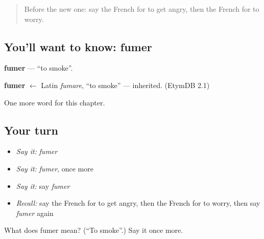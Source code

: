 \begin{quote}
Before the new one: say the French for to get angry, then the French for to worry.
\end{quote}

\subsection*{You'll want to know: fumer}
\textbf{fumer} — \textquotedblleft{}to smoke\textquotedblright{}.

\begin{cousinweb}
\textbf{fumer} $\leftarrow$ Latin \emph{fumare}, \textquotedblleft{}to smoke\textquotedblright{} — inherited. (EtymDB 2.1)
\end{cousinweb}

\begin{grammarlens}[title={What you've built}]
One more word for this chapter.
\end{grammarlens}

\subsection*{Your turn}
\begin{itemize}
\raggedright
  \item \emph{Say it:} \emph{fumer}
  \item \emph{Say it:} \emph{fumer}, once more
  \item \emph{Say it:} say \emph{fumer}
  \item \emph{Recall:} say the French for to get angry, then the French for to worry, then say \emph{fumer} again
\end{itemize}

\begin{tcolorbox}[breakable,colback=teal!4,colframe=teal!35!black,title={Before you move on}]
What does fumer mean? (\textquotedblleft{}To smoke\textquotedblright{}.) Say it once more.
\end{tcolorbox}

